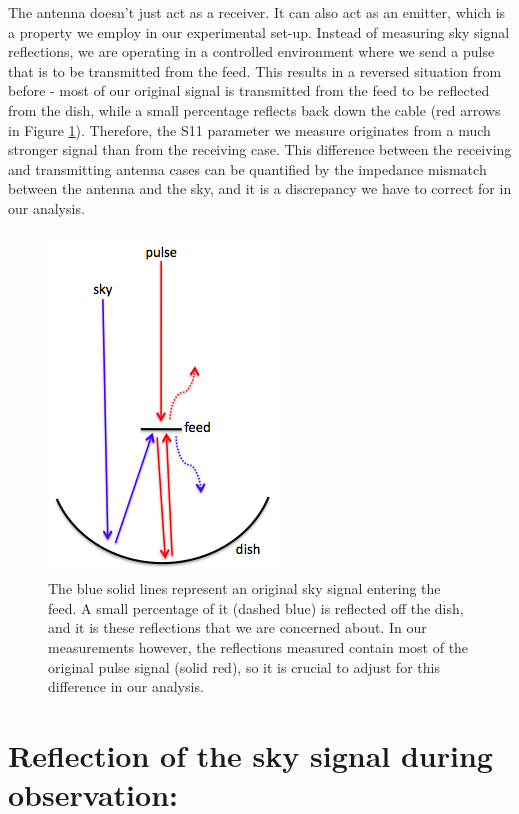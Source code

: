 \documentclass[12pt,preprint]{aastex}
\begin{document}
The antenna doesn't just act as a receiver. It can also act as an emitter, which is a property we employ in our experimental set-up. Instead of measuring sky signal reflections, we are operating in a controlled environment where we send a pulse that is to be transmitted from the feed. This results in a reversed situation from before - most of our original signal is transmitted from the feed to be reflected from the dish, while a small percentage reflects back down the cable (red arrows in Figure \ref{fig:cartoon}). Therefore, the S11 parameter we measure originates from a much stronger signal than from the receiving case. This difference between the receiving and transmitting antenna cases can be quantified by the impedance mismatch between the antenna and the sky, and it is a discrepancy we have to correct for in our analysis.

\begin{figure}
\centering
\includegraphics[totalheight=0.5\textheight]{plots/reflection_cartoon.png}
\caption{The blue solid lines represent an original sky signal entering the feed. A small percentage of it (dashed blue) is reflected off the dish, and it is these reflections that we are concerned about. In our measurements however, the reflections measured contain most of the original pulse signal (solid red), so it is crucial to adjust for this difference in our analysis.}
\label{fig:cartoon}
\end{figure}


\section{Reflection of the sky signal during observation:}
\end{document}
